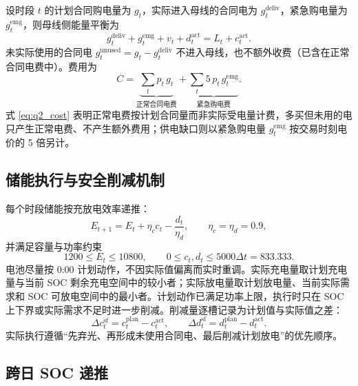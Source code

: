 \documentclass[withoutpreface,bwprint]{cumcmthesis}
\begin{document}
设时段 $t$ 的计划合同购电量为 $g_t$，实际进入母线的合同电为 $g_t^{\mathrm{deliv}}$，紧急购电量为 $g_t^{\mathrm{emg}}$，则母线侧能量平衡为
\begin{equation}
g_t^{\mathrm{deliv}}+g_t^{\mathrm{emg}}+v_t+d_t^{\mathrm{act}}=L_t+c_t^{\mathrm{act}}.
\label{eq:q2_balance}
\end{equation}
未实际使用的合同电 $g_t^{\mathrm{unused}}=g_t-g_t^{\mathrm{deliv}}$ 不进入母线，也不额外收费（已含在正常合同电费中）。费用为
\begin{equation}
C=\underbrace{\sum_{t} p_t\,g_t}_{\text{正常合同电费}}+\underbrace{\sum_{t} 5\,p_t\,g_t^{\mathrm{emg}}}_{\text{紧急购电费}}.
\label{eq:q2_cost}
\end{equation}
式 \eqref{eq:q2_cost} 表明正常电费按计划合同量而非实际受电量计费，多买但未用的电只产生正常电费、不产生额外费用；供电缺口则以紧急购电量 $g_t^{\mathrm{emg}}$ 按交易时刻电价的 5 倍另计。

\subsection{储能执行与安全削减机制}

每个时段储能按充放电效率递推：
\begin{equation}
E_{t+1}=E_t+\eta_c c_t-\frac{d_t}{\eta_d},\qquad \eta_c=\eta_d=0.9,
\label{eq:q2_soc}
\end{equation}
并满足容量与功率约束
\begin{equation}
1200\le E_t\le 10800,\qquad 0\le c_t,d_t\le 5000\Delta t=833.333.
\label{eq:q2_bounds}
\end{equation}
电池尽量按 0:00 计划动作，不因实际值偏离而实时重调。实际充电量取计划充电量与当前 SOC 剩余充电空间中的较小者；实际放电量取计划放电量、当前实际需求和 SOC 可放电空间中的最小者。计划动作已满足功率上限，执行时只在 SOC 上下界或实际需求不足时进一步削减。削减量逐槽记录为计划值与实际值之差：
\begin{equation}
\Delta c_t^{\mathrm{sf}}=c_t^{\mathrm{plan}}-c_t^{\mathrm{act}},\qquad
\Delta d_t^{\mathrm{sf}}=d_t^{\mathrm{plan}}-d_t^{\mathrm{act}}.
\label{eq:q2_shortfall}
\end{equation}
实际执行遵循“先弃光、再形成未使用合同电、最后削减计划放电”的优先顺序。

\subsection{跨日 SOC 递推}
\end{document}
